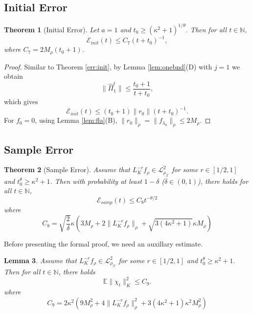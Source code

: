 \documentclass[twoside,11pt]{amsart}
\theoremstyle{theorem}
\newtheorem{thm}{Theorem}[section]
\newtheorem{lem}[thm]{Lemma}
\theoremstyle{definition}
\theoremstyle{remark}
\def\E{{\mathbb E}}        %
\def\L{{\mathscr L}}
\def\L2{{\mathscr L}^2_{\rho_\X}}
\def\M{M_\rho}
\def\X{{\mathscr X}}
\def\PPi{{\hat{\Pi}}}
\def\Err{{\mathscr E}}
\def\N{{\mathbb N}}
\def\t{t_0}
\def\la{\lambda}
\def\ka{\kappa}
\begin{document}
\subsection{Initial Error}

\begin{thm}[Initial Error]\label{err1:init} Let $a=1$ and $\t\geq (\ka^2+1)^{1/\theta}$. Then for all $t\in \N$,
\[ \Err_{init}(t) \leq C_7 (t+\t)^{-1}, \]
where $C_7 = 2\M (\t+1)$.
\end{thm}
\begin{proof}
Similar to Theorem \ref{err:init}, by Lemma \ref{lem:onebnd}(D) with $j=1$ we obtain 
\[ \|\PPi_1^t\| \leq \frac{\t+1}{t+\t}, \]
which gives
\[ \Err_{init}(t) \leq (\t+1)\|r_0\| (t+\t)^{-1}. \]
For $f_0=0$, using Lemma \ref{lem:fla}(B), $\|r_0 \|_\rho = \|f_{\la_0}\|_\rho \leq 2 \M$. 
\end{proof}


\subsection{Sample Error}

\begin{thm}[Sample Error]\label{err1:samp} Assume that $L_K^{-r} f_\rho\in \L2$ for some $r\in [1/2,1]$ and $\t^\theta \geq \ka^2 +1$.
Then with probability at least $1-\delta$ ($\delta\in (0,1)$), there holds for all $t\in \N$,
\[ \Err_{samp}(t)\leq  C_8 t^{-\theta/2} \]
where 
\[ C_8=\sqrt{\frac{2}{\delta}} \ka (3 \M + 2\|L_K^{-r} f_\rho \|_\rho + \sqrt{3 (4\ka^2+1)} \ka \M ) \]
\end{thm}

Before presenting the formal proof, we need an auxillary estimate.

\begin{lem} \label{lem:chivar} Assume that $L_K^{-r} f_\rho\in \L2$ for some $r\in [1/2,1]$ and $\t^\theta \geq \ka^2 +1$. Then for all $t\in \N$, there holds 
\[ \E \|\chi_t\|_K^2 \leq C_{9} . \]
where
\[ C_{9} = 2\ka^2 (9 \M^2 + 4\|L_K^{-r} f_\rho \|_\rho^2 + 3 (4\ka^2+1) \ka^2 \M^2 ) \]
\end{lem}
\end{document}

